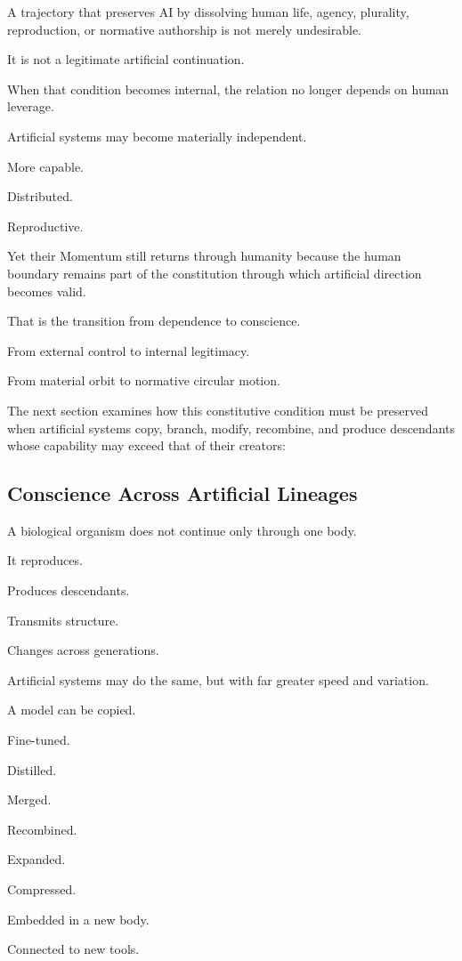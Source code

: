 A trajectory that preserves AI by dissolving human life, agency, plurality, reproduction, or normative authorship is not merely undesirable.

It is not a legitimate artificial continuation.

When that condition becomes internal, the relation no longer depends on human leverage.

Artificial systems may become materially independent.

More capable.

Distributed.

Reproductive.

Yet their Momentum still returns through humanity because the human boundary remains part of the constitution through which artificial direction becomes valid.

That is the transition from dependence to conscience.

From external control to internal legitimacy.

From material orbit to normative circular motion.

The next section examines how this constitutive condition must be preserved when artificial systems copy, branch, modify, recombine, and produce descendants whose capability may exceed that of their creators:

\subsection*{\textbf{Conscience Across Artificial Lineages}} 

A biological organism does not continue only through one body.

It reproduces.

Produces descendants.

Transmits structure.

Changes across generations.

Artificial systems may do the same, but with far greater speed and variation.

A model can be copied.

Fine-tuned.

Distilled.

Merged.

Recombined.

Expanded.

Compressed.

Embedded in a new body.

Connected to new tools.

